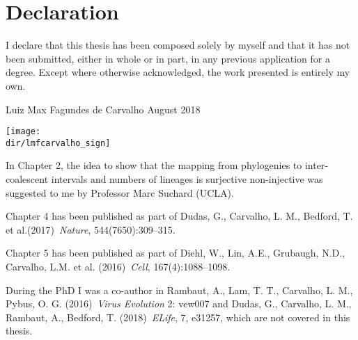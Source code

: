\chapter{Declaration}
\vspace*{2\baselineskip}
I declare that this thesis has been composed 
solely by myself and that it has not been submitted, either in whole or
in part, in any previous application for a degree.
Except where otherwise acknowledged, the work presented is entirely my
own.
\vspace{6\baselineskip}\\
\begin{flushright}
\hspace*{\fill}
Luiz Max Fagundes de Carvalho
\newline
August 2018

\texttt{[image: \\dir/lmfcarvalho\_sign]}

\end{flushright}

\cleardoublepage

In Chapter 2, the idea to show that the mapping from phylogenies to inter-coalescent intervals and numbers of lineages is surjective non-injective was suggested to me by Professor Marc Suchard (UCLA).

Chapter 4 has been published as part of Dudas, G., Carvalho, L. M., Bedford, T. et al.(2017)~\textit{Nature}, 544(7650):309--315.

Chapter 5 has been published as part of Diehl, W., Lin, A.E., Grubaugh, N.D., Carvalho, L.M. et al. (2016)~\textit{Cell}, 167(4):1088--1098.

During the PhD I was a co-author in Rambaut, A., Lam, T. T., Carvalho, L. M.,  Pybus, O. G. (2016)~\textit{Virus Evolution} 2: vew007 and Dudas, G., Carvalho, L. M., Rambaut, A.,  Bedford, T. (2018)~\textit{ELife}, 7, e31257, which are not covered in this thesis.
